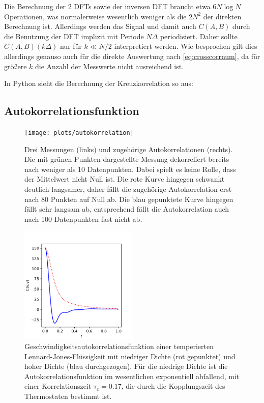 Die Berechnung der 2 DFTs sowie der inversen DFT braucht etwa $6 N\log
N$ Operationen, was normalerweise wesentlich weniger als die $2N^2$
der direkten Berechnung ist.  Allerdings werden das Signal und damit
auch $C(A,B)$ durch die Benutzung der DFT implizit mit Periode
$N\Delta$ periodisiert. Daher sollte $C(A,B)(k\Delta)$ nur für $k\ll
N/2$ interpretiert werden. Wie besprochen gilt dies allerdings genauso
auch für die direkte Auswertung nach \eqref{eq:crosscorrnum}, da für
größere $k$ die Anzahl der Messwerte nicht ausreichend ist.

In Python sieht die Berechnung der Kreuzkorrelation so aus:


\subsection{Autokorrelationsfunktion}

\begin{figure}
  \centering
  \texttt{[image: plots/autokorrelation]}
  \caption{Drei Messungen (links) und zugehörige Autokorrelationen (rechts).
  Die mit grünen Punkten dargestellte Messung
  dekorreliert bereits nach weniger als 10 Datenpunkten. Dabei spielt es
  keine Rolle, dass der Mittelwert nicht Null ist. Die rote Kurve hingegen
  schwankt deutlich langsamer, daher fällt die zugehörige Autokorrelation 
  erst nach 80 Punkten auf Null ab. Die blau gepunktete Kurve hingegen
  fällt sehr langsam ab, entsprechend fällt die Autokorrelation auch nach 100
  Datenpunkten fast nicht ab.}
  \label{fig:acfs}
\end{figure}

\begin{figure}
  \centering
  \includegraphics[width=0.5\textwidth]{plots/v_ac}
  \caption{Geschwindigkeitsautokorrelationsfunktion einer temperierten
    Lennard-Jones-Flüs\-sig\-ke\-it mit niedriger Dichte (rot
    gepunktet) und hoher Dichte (blau durchgezogen). Für die niedrige
    Dichte ist die Autokorrelationsfunktion im wesentlichen
    exponentiell abfallend, mit einer Korrelationszeit $\tau_c=0.17$,
    die durch die Kopplungszeit des Thermostaten bestimmt ist.}
  \label{fig:vac}
\end{figure}

